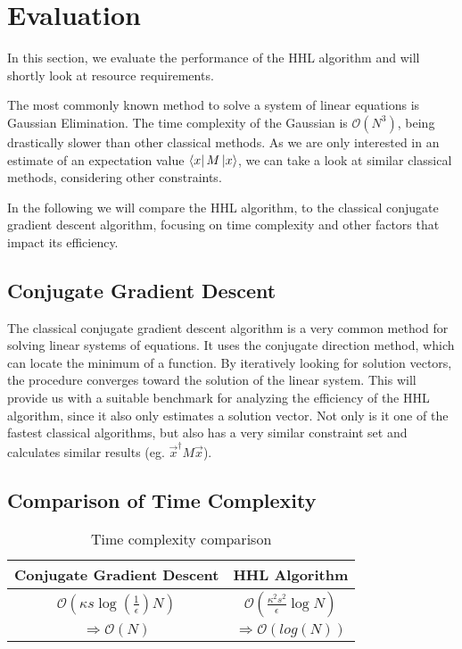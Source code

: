 \section{Evaluation}

\begin{comment}
look at gauß verfahren 
not fastest
look at same constraints 
conjugate gradient descent much faster with similiar requirements
only interested in estimate of $\vec{x}^\dagger M \vec x$
this runs in $ \mathcal{O}(\kappa s log{\left(\frac 1 \epsilon\right)} N ) $
where 
\end{comment}

In this section, we evaluate the performance of the HHL algorithm and will shortly look at resource requirements.

The most commonly known method to solve a system of linear equations is Gaussian Elimination. 
The time complexity of the Gaussian is $\mathcal{O} (N^3)$, being drastically slower than other classical methods.
As we are only interested in an estimate of an expectation value $\bra x M \ket x$, we can take a look at similar classical methods, considering other constraints.

In the following we will compare the HHL algorithm, to the classical conjugate gradient descent algorithm, focusing on time complexity and other factors that impact its efficiency.

\subsection{Conjugate Gradient Descent}
The classical conjugate gradient descent algorithm is a very common method for solving linear systems of equations. 
It uses the conjugate direction method, which can locate the minimum of a function. 
By iteratively looking for solution vectors, the procedure converges toward the solution of the linear system.
This will provide us with a suitable benchmark for analyzing the efficiency of the HHL algorithm, since it also only estimates a solution vector.
Not only is it one of the fastest classical algorithms, but also has a very similar constraint set and calculates similar results (eg. $\vec{x}^\dagger M \vec x$).

\subsection{Comparison of Time Complexity }
\begin{table}[htbp]
    \caption{Time complexity comparison}
    \begin{center}
    \begin{tabular}{|c|c|}
    \hline
    \textbf{Conjugate Gradient Descent} & \textbf{HHL Algorithm} \\
    \hline
    $\mathcal{O}(\kappa s \log\left(\frac{1}{\epsilon}\right) N)$  &  $\mathcal{O}\left(\frac{\kappa^2s^2}{\epsilon}\log N\right)$\\
    \hline
    $\Rightarrow \mathcal{O} (N)$ & $\Rightarrow \mathcal{O} (log(N))$\\ 
    \hline
    \end{tabular}
    \end{center}
\end{table}

